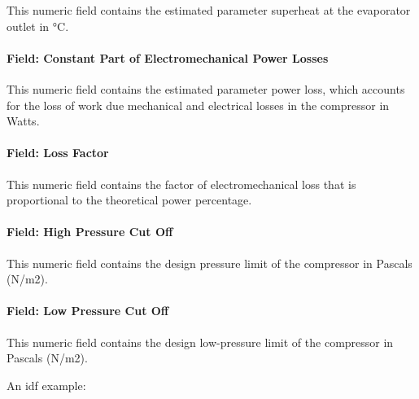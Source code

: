 This numeric field contains the estimated parameter superheat at the evaporator outlet in °C.

\paragraph{Field: Constant Part of Electromechanical Power Losses}\label{field-constant-part-of-electromechanical-power-losses}

This numeric field contains the estimated parameter power loss, which accounts for the loss of work due mechanical and electrical losses in the compressor in Watts.

\paragraph{Field: Loss Factor}\label{field-loss-factor}

This numeric field contains the factor of electromechanical loss that is proportional to the theoretical power percentage.

\paragraph{Field: High Pressure Cut Off}\label{field-high-pressure-cut-off}

This numeric field contains the design pressure limit of the compressor in Pascals (N/m2).

\paragraph{Field: Low Pressure Cut Off}\label{field-low-pressure-cut-off}

This numeric field contains the design low-pressure limit of the compressor in Pascals (N/m2).

An idf example:

